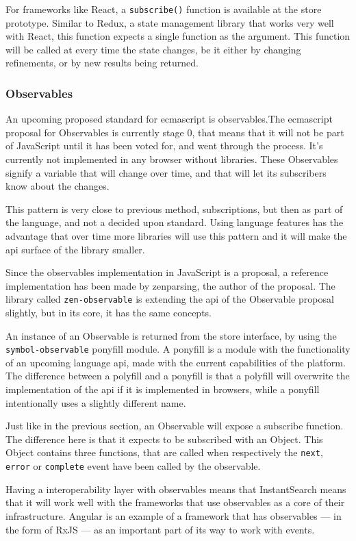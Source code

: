 For frameworks like React, a {\tt subscribe()} function is available at the store prototype. Similar to Redux\cite{redux-glossary-store}, a state management \gls{library} that works very well with React, this function expects a single function as the argument. This function will be called at every time the state changes, be it either by changing \glspl{refinement}, or by new results being returned.


\subsubsection{Observables}
\label{ssub:observables}

An upcoming proposed standard for \acrshort{ecmascript} is observables.The \acrshort{ecmascript} proposal for Observables is currently stage 0\cite{tc39-observable}, that means that it will not be part of JavaScript until it has been voted for, and went through the process. It's currently not implemented in any browser without libraries. These Observables signify a variable that will change over time, and that will let its subscribers know about the changes.

This pattern is very close to previous method, subscriptions, but then as part of the language, and not a decided upon standard. Using language features has the advantage that over time more libraries will use this pattern and it will make the \acrshort{api} surface of the \gls{library} smaller.

Since the observables implementation in JavaScript is a proposal, a reference implementation has been made by zenparsing, the author of the proposal. The \gls{library} called {\tt zen-observable}\cite{zenparsing-observable} is extending the \acrshort{api} of the Observable proposal slightly, but in its core, it has the same concepts.

An instance of an Observable is returned from the store interface, by using the {\tt symbol-observable}\cite{symbol-observable} ponyfill module. A ponyfill\cite{ponyfill} is a module with the functionality of an upcoming language \acrshort{api}, made with the current capabilities of the platform. The difference between a polyfill and a ponyfill is that a polyfill will overwrite the implementation of the \acrshort{api} if it is implemented in browsers, while a ponyfill intentionally uses a slightly different name.

Just like in the previous section, an Observable will expose a subscribe function. The difference here is that it expects to be subscribed with an Object. This Object contains three functions, that are called when respectively the {\tt next}, {\tt error} or {\tt complete} event have been called by the observable.

Having a interoperability layer with observables means that InstantSearch means that it will work well with the frameworks that use observables as a core of their infrastructure. Angular is an example of a framework that has observables --- in the form of RxJS\cite{angular-rx} --- as an important part of its way to work with events.

